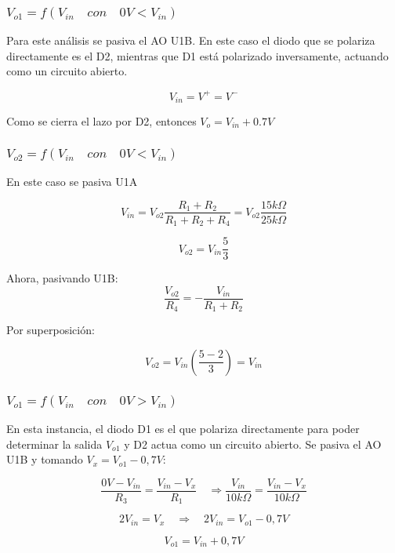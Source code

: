 \subsubsection{ $V_{o1} = f(V_{in} \quad con \quad 0V < V_{in}) $}

Para este análisis se pasiva el AO U1B. En este caso el diodo que se polariza directamente es el D2, mientras que D1 está polarizado inversamente, actuando como un circuito abierto.

\[V_{in} = V^+ =V^- \]

Como se cierra el lazo por D2, entonces $V_o = V_{in} + 0.7V $

\vspace{1em}

\subsubsection{ $V_{o2} = f(V_{in} \quad con \quad 0V < V_{in}) $}

En este caso se pasiva U1A

\[V_{in} = V_{o2} \frac {R_1 +R_2}{R_1 + R_2 + R_4} = V_{o2} \frac{15k\Omega}{25k\Omega}\]

\[V_{o2}=V_{in}\frac{5}{3} \]

Ahora, pasivando U1B:
\[ \frac{V_{o2}}{R_4} =- \frac{V_{in}}{R_1 + R_2} \]


Por superposición: 

\[ V_{o2} =V_{in}(\frac{5-2}{3}) = V_{in}\]

\vspace{1em}

\subsubsection{ $V_{o1} = f(V_{in} \quad con \quad 0V > V_{in}) $}

En esta instancia, el diodo D1 es el que polariza directamente para poder determinar la salida $V_{o1}$ y D2 actua como un circuito abierto.
Se pasiva el AO U1B y tomando $V_x = V_{o1} - 0,7V $:

\[ \frac{0V -V_{in}}{R_3} = \frac{V_{in}-V_x}{R_1} \quad  \Rightarrow \frac{V_{in}}{10k\Omega} = \frac{V_{in}-V_x}{10k\Omega}\]

\[ 2V_{in} = V_x \quad  \Rightarrow \quad 2V_{in}=V_{o1} -0,7V \]

\[ V_{o1} = V_{in} + 0,7V \]

\vspace{1em}

